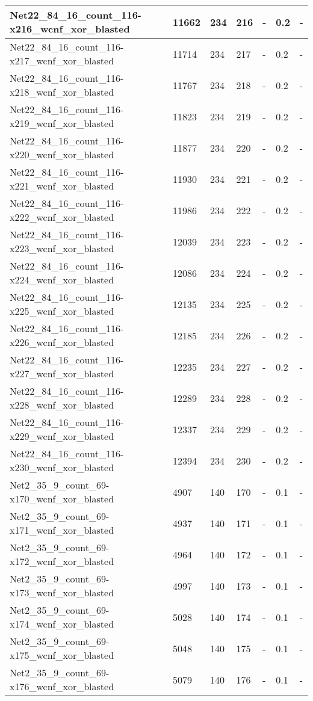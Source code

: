 \begin{scriptsize}
\begin{longtable}{|p{5cm}|l|l|l|l|l|l|}
Net22\_84\_16\_count\_116-x216\_wcnf\_xor\_blasted&11662&234&216&-&0.2&- \\ \hline 
Net22\_84\_16\_count\_116-x217\_wcnf\_xor\_blasted&11714&234&217&-&0.2&- \\ \hline 
Net22\_84\_16\_count\_116-x218\_wcnf\_xor\_blasted&11767&234&218&-&0.2&- \\ \hline 
Net22\_84\_16\_count\_116-x219\_wcnf\_xor\_blasted&11823&234&219&-&0.2&- \\ \hline 
Net22\_84\_16\_count\_116-x220\_wcnf\_xor\_blasted&11877&234&220&-&0.2&- \\ \hline 
Net22\_84\_16\_count\_116-x221\_wcnf\_xor\_blasted&11930&234&221&-&0.2&- \\ \hline 
Net22\_84\_16\_count\_116-x222\_wcnf\_xor\_blasted&11986&234&222&-&0.2&- \\ \hline 
Net22\_84\_16\_count\_116-x223\_wcnf\_xor\_blasted&12039&234&223&-&0.2&- \\ \hline 
Net22\_84\_16\_count\_116-x224\_wcnf\_xor\_blasted&12086&234&224&-&0.2&- \\ \hline 
Net22\_84\_16\_count\_116-x225\_wcnf\_xor\_blasted&12135&234&225&-&0.2&- \\ \hline 
Net22\_84\_16\_count\_116-x226\_wcnf\_xor\_blasted&12185&234&226&-&0.2&- \\ \hline 
Net22\_84\_16\_count\_116-x227\_wcnf\_xor\_blasted&12235&234&227&-&0.2&- \\ \hline 
Net22\_84\_16\_count\_116-x228\_wcnf\_xor\_blasted&12289&234&228&-&0.2&- \\ \hline 
Net22\_84\_16\_count\_116-x229\_wcnf\_xor\_blasted&12337&234&229&-&0.2&- \\ \hline 
Net22\_84\_16\_count\_116-x230\_wcnf\_xor\_blasted&12394&234&230&-&0.2&- \\ \hline 
Net2\_35\_9\_count\_69-x170\_wcnf\_xor\_blasted&4907&140&170&-&0.1&- \\ \hline 
Net2\_35\_9\_count\_69-x171\_wcnf\_xor\_blasted&4937&140&171&-&0.1&- \\ \hline 
Net2\_35\_9\_count\_69-x172\_wcnf\_xor\_blasted&4964&140&172&-&0.1&- \\ \hline 
Net2\_35\_9\_count\_69-x173\_wcnf\_xor\_blasted&4997&140&173&-&0.1&- \\ \hline 
Net2\_35\_9\_count\_69-x174\_wcnf\_xor\_blasted&5028&140&174&-&0.1&- \\ \hline 
Net2\_35\_9\_count\_69-x175\_wcnf\_xor\_blasted&5048&140&175&-&0.1&- \\ \hline 
Net2\_35\_9\_count\_69-x176\_wcnf\_xor\_blasted&5079&140&176&-&0.1&- \\ \hline 

\end{longtable}
\end{scriptsize}
